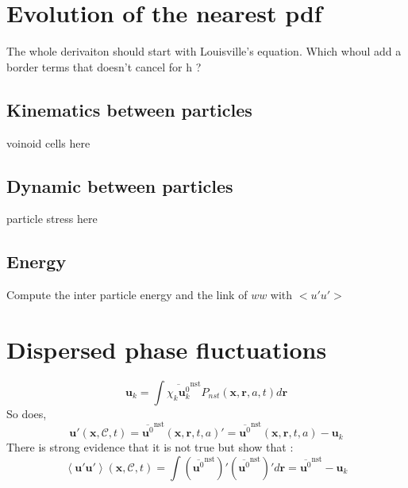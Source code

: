 \documentclass[12pt]{My_preprint}
\newcommand{\avg}[1]{\left<#1\right>}
\renewcommand{\avg}[1]{\left<#1\right>}
\newcommand{\nstavg}[1]{\overline{#1}^\text{nst}}
\newcommand{\CC}{\mathscr{C}}
\begin{document}
\section{Evolution of the nearest pdf}
The whole derivaiton should start with Louisville's equation. 
Which whoul add a border terms that doesn't cancel for h ? 







\subsection{Kinematics between particles}
voinoid cells here
\subsection{Dynamic between particles}
particle stress here
\subsection{Energy}
Compute the inter particle energy and the link of $ww$ with $<u'u'>$ 

\section{Dispersed phase fluctuations}
\begin{equation}
    \textbf{u}_k
    = \int \nstavg{\chi_k \textbf{u}_k^0} P_{nst}(\textbf{x},\textbf{r},a,t)d\textbf{r}
\end{equation}
So does, 
\begin{equation}
    \textbf{u}'(\textbf{x},\CC,t)
    =\nstavg{ \textbf{u}^0}(\textbf{x},\textbf{r},t,a)' 
    = \nstavg{ \textbf{u}^0}(\textbf{x},\textbf{r},t,a) - \textbf{u}_k
\end{equation}
There is strong evidence that it is not true but show that :
\begin{equation}
    \avg{\textbf{u}'\textbf{u}'}(\textbf{x},\CC,t)
    =\int{ (\nstavg{ \textbf{u}^0} )'(\nstavg{ \textbf{u}^0})' }d\textbf{r}
    = \nstavg{ \textbf{u}^0} - \textbf{u}_k
\end{equation}
\end{document}
